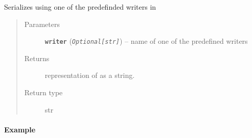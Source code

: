 \documentclass[letterpaper,10pt,english]{sphinxmanual}
\begin{document}
\begin{fulllineitems}
\begin{fulllineitems}
\end{fulllineitems}


\begin{fulllineitems}
\label{modules/pybibtools:listb.pybibtools.Bibliography.dump}
Serializes {\hyperref[modules/pybibtools:listb.pybibtools.Bibliography.data]{}} using one of the predefinded writers
in {\hyperref[modules/pybibtools:listb.pybibtools.Bibliography.WRITERS]{}}
\begin{quote}\begin{description}
\item[{Parameters}] \leavevmode
\textbf{\texttt{writer}} (\emph{\texttt{Optional{[}str{]}}}) -- name of one of the predefined writers

\item[{Returns}] \leavevmode
representation of {\hyperref[modules/pybibtools:listb.pybibtools.Bibliography.data]{}} as a string.

\item[{Return type}] \leavevmode
str

\end{description}\end{quote}
\paragraph{Example}


\end{fulllineitems}
\end{fulllineitems}
\end{document}
